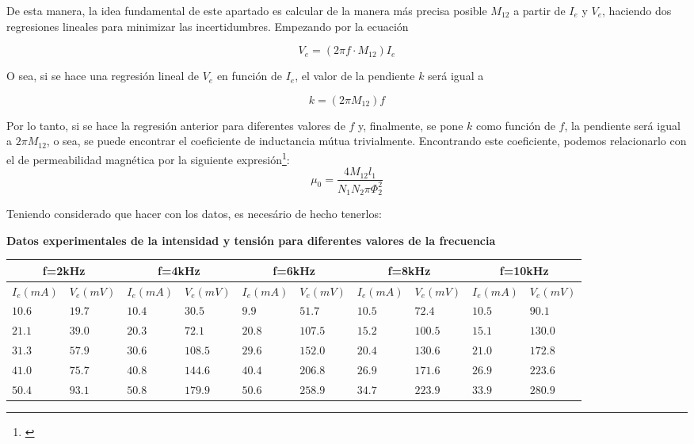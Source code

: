 \documentclass[a4paper,12pt]{article}
\begin{document}
De esta manera, la idea fundamental de este apartado es calcular de la manera más precisa posible $M_{12}$ a partir de $I_e$ y $V_e$, haciendo dos regresiones lineales para minimizar las incertidumbres. Empezando por la ecuación

$$V_e = \left(2\pi f \cdot M_{12}  \right)I_e $$

O sea, si se hace una regresión lineal de $V_e$ en función de $I_e$, el valor de la pendiente $k$ será igual a

$$k = \left(  2\pi M_{12}\right) f$$

Por lo tanto, si se hace la regresión anterior para diferentes valores de $f$ y, finalmente, se pone $k$ como función de $f$, la pendiente será igual a $2\pi M_{12}$, o sea, se puede encontrar el coeficiente de inductancia mútua trivialmente. Encontrando este coeficiente, podemos relacionarlo con el de permeabilidad magnética por la siguiente expresión\footnote{\cite[323]{Griffiths}}:
\begin{equation}
    \mu_0 = \frac{4 M_{12} l_1}{N_1 N_2 \pi \Phi^2_2}
\end{equation}


Teniendo considerado que hacer con los datos, es necesário de hecho tenerlos:

\pagebreak
\begin{center}
    \textbf{Datos experimentales de la intensidad y tensión para diferentes valores de la frecuencia}
\end{center}

\begin{table}[h!]
    \hskip-1.5cm
    \begin{tabular}{|l|l|l|l|l|l|l|l|l|l|}
        \hline
    \multicolumn{2}{|c|}{f=2kHz} &\multicolumn{2}{|c|}{f=4kHz} &\multicolumn{2}{|c|}{f=6kHz} &\multicolumn{2}{|c|}{f=8kHz} &\multicolumn{2}{|c|}{f=10kHz}  \\ \hline
        $I_{e}(mA)$ & $V_e(mV)$ & $I_{e}(mA)$ & $V_e(mV)$ &$I_{e}(mA)$ & $V_e(mV)$ &$I_{e}(mA)$ & $V_e(mV)$&$I_{e}(mA)$ & $V_e(mV)$ \\ \hline
        $10.6$ & $19.7 $& $10.4$ & $30.5$ &$ 9.9$ & $51.7$ &$ 10.5$ & $72.4$ & $10.5$ & $90.1$ \\ \hline
        $21.1$ & $39.0$ & $20.3$ & $72.1$ & $20.8$ & $107.5$ & $15.2$ & $100.5$ & $15.1$ & $130.0$\\ \hline
        $31.3$ & $57.9$ & $30.6$ & $108.5$ & $29.6$ & $152.0$ & $20.4$ & $130.6$ & $21.0$ & $172.8$ \\ \hline
        $41.0$ & $75.7$ & $40.8$ & $144.6$ & $40.4$ & $206.8$ & $26.9$ & $171.6$ & $26.9$ & $223.6$ \\ \hline
       $ 50.4$ & $93.1$ & $50.8$ & $179.9$ & $50.6$ & $258.9$ & $34.7$ & $223.9$ & $33.9$ & $280.9$ \\ \hline
    \end{tabular}
\end{table}
\end{document}
